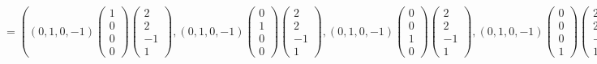 \documentclass{article}
\begin{document}
$$= \left(\left(0, 1, 0, -1\right)\begin{pmatrix}1 \\ 0 \\ 0 \\ 0\end{pmatrix}\begin{pmatrix}2 \\ 2 \\ -1 \\ 1\end{pmatrix}, \left(0, 1, 0, -1\right)\begin{pmatrix}0 \\ 1 \\ 0 \\ 0\end{pmatrix}\begin{pmatrix}2 \\ 2 \\ -1 \\ 1\end{pmatrix}, \left(0, 1, 0, -1\right)\begin{pmatrix}0 \\ 0 \\ 1 \\ 0\end{pmatrix}\begin{pmatrix}2 \\ 2 \\ -1 \\ 1\end{pmatrix}, \left(0, 1, 0, -1\right)\begin{pmatrix}0 \\ 0 \\ 0 \\ 1\end{pmatrix}\begin{pmatrix}2 \\ 2 \\ -1 \\ 1\end{pmatrix}\right) =$$
\end{document}

